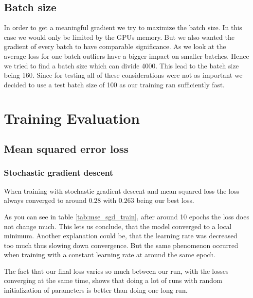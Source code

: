 \subsection{Batch size}
In order to get a meaningful gradient we try to maximize the batch size. 
In this case we would only be limited by the GPUs memory. 
But we also wanted the gradient of every batch to have comparable significance. As we look at the average loss for one batch outliers have a bigger impact on smaller batches. Hence we tried to find a batch size which can divide 4000.
This lead to the batch size being 160. Since for testing all of these considerations were not as important we decided to use a test batch size of 100 as our training ran sufficiently fast.

\section{Training Evaluation}

\subsection{Mean squared error loss}

\subsubsection{Stochastic gradient descent}
When training with stochastic gradient descent and mean 
squared loss the loss always converged to around $0.28$ 
with $0.263$ being our best loss.

As you can see in table \ref*{tab:mse_sgd_train}, after around 10 epochs 
the loss does not change much.
This lets us conclude, that the model converged to a local minimum. Another explanation
could be, that the learning rate was decreased too much thus slowing down convergence. 
But the same phenomenon occurred when training with a constant learning rate at around 
the same epoch.

The fact that our final loss varies so much between our run, with the losses 
converging at the same time, shows that doing a lot of runs with random 
initialization of parameters is better than doing one long run.


